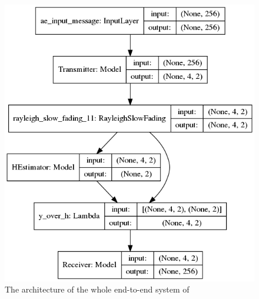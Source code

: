 \documentclass[12pt,onecolumn,letterpaper]{article}
\newcommand\genfigsize{0.5}
\begin{document}
\begin{figure}
   \centering
   \includegraphics[width=\genfigsize\linewidth]{figures/aoudia_paper/autoencoder_rsf_arch.png}
   \caption{The architecture of the whole end-to-end system of }
   \label{fig:RsfSupervisedArch}
\end{figure}
\end{document}
